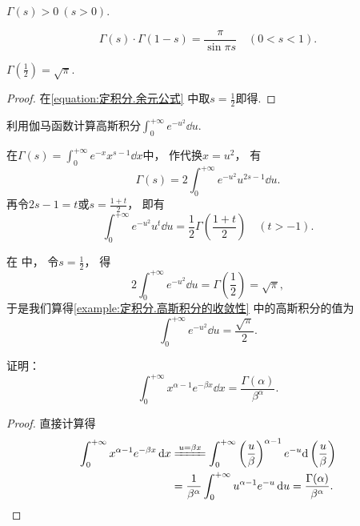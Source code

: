 \begin{proposition}
\(\Gamma(s) > 0\ (s>0)\).
\end{proposition}

\begin{property}[余元公式]
\begin{equation}\label{equation:定积分.余元公式}
	\Gamma(s) \cdot \Gamma(1-s)
	= \frac{\pi}{\sin{\pi s}} \quad (0 < s < 1).
\end{equation}
\end{property}

\begin{corollary}
\(\Gamma\left(\frac{1}{2}\right) = \sqrt{\pi}\).
\begin{proof}
在\cref{equation:定积分.余元公式} 中取\(s = \frac12\)即得.
\end{proof}
\end{corollary}

\begin{example}
利用伽马函数计算高斯积分\(\int_0^{+\infty} e^{-u^2} \dd{u}\).
\begin{solution}
在\(\Gamma(s) = \int_0^{+\infty} e^{-x} x^{s-1} \dd{x}\)中，
作代换\(x = u^2\)，
有\begin{equation}\label{equation:定积分.伽马函数.中间步骤1}
	\Gamma(s) = 2 \int_0^{+\infty} e^{-u^2} u^{2s-1} \dd{u}.
\end{equation}
再令\(2s-1 = t\)或\(s = \frac{1+t}{2}\)，
即有\begin{equation}
	\int_0^{+\infty} e^{-u^2} u^t \dd{u}
	= \frac{1}{2} \Gamma\left(\frac{1+t}{2}\right)
	\quad (t > -1).
\end{equation}

在  中，
令\(s=\frac12\)，
得\[
	2\int_0^{+\infty} e^{-u^2} \dd{u}
	= \Gamma\left(\frac{1}{2}\right)
	= \sqrt{\pi},
\]
于是我们算得\cref{example:定积分.高斯积分的收敛性} 中的高斯积分的值为\begin{equation}
	\int_0^{+\infty} e^{-u^2} \dd{u} = \frac{\sqrt{\pi}}{2}.
\end{equation}
\end{solution}
\end{example}

\begin{example}
证明：\begin{equation}
	\int_0^{+\infty} x^{\alpha-1} e^{-\beta x} \dd{x}
	= \frac{\Gamma(\alpha)}{\beta^\alpha}.
\end{equation}
\begin{proof}
直接计算得
\begin{align*}
	\int_0^{+\infty} x^{\alpha-1} e^{-\beta x} \dd{x}
	&\xlongequal{u=\beta x}
		\int_0^{+\infty}
			\left(\frac{u}{\beta}\right)^{\alpha-1}
			e^{-u} \dd\left(\frac{u}{\beta}\right) \\
	&= \frac{1}{\beta^\alpha} \int_0^{+\infty} u^{\alpha-1} e^{-u} \dd{u}
	= \frac{\Gamma(\alpha)}{\beta^\alpha}.
	\qedhere
\end{align*}
\end{proof}
\end{example}

